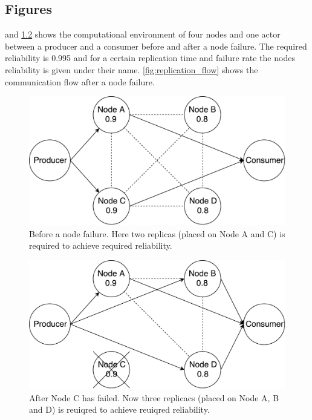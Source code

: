 \documentclass{cslthse-msc}
\begin{document}
\begin{appendices}
\chapter{Figures} \label{appendix:figures}
 and \cref{fig:after_node_failure} shows the computational environment of four nodes and one actor between a producer and a consumer before and after a node failure. The required reliability is 0.995 and for a certain replication time and failure rate the nodes reliability is given under their name. \cref{fig:replication_flow} shows the communication flow after a node failure.

\begin{figure}[!hbt]
\centering
\includegraphics[scale=0.5]{images/before_node_failure.pdf}
\caption{Before a node failure. Here two replicas (placed on Node A and C) is required to achieve required reliability.} \label{fig:before_node_failure}
\end{figure}

\begin{figure}[!hbt]
\centering
\includegraphics[scale=0.5]{images/after_node_failure.pdf}
\caption{After Node C has failed. Now three replicacs (placed on Node A, B and D) is reuiqred to achieve reuiqred reliability.} \label{fig:after_node_failure}
\end{figure}


\end{appendices}
\end{document}

